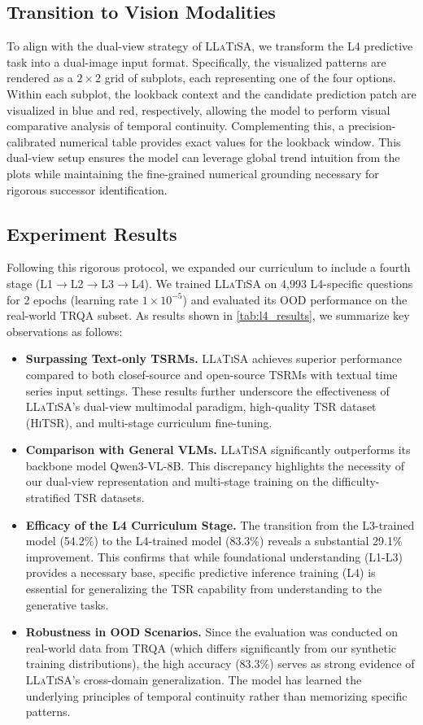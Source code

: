\documentclass[11pt]{article}
\begin{document}
\subsection{Transition to Vision Modalities}
To align with the dual-view strategy of \textsc{LLaTiSA}, we transform the L4 predictive task into a dual-image input format. Specifically, the visualized patterns are rendered as a $2\times2$ grid of subplots, each representing one of the four options. Within each subplot, the lookback context and the candidate prediction patch are visualized in blue and red, respectively, allowing the model to perform visual comparative analysis of temporal continuity. Complementing this, a precision-calibrated numerical table provides exact values for the lookback window. This dual-view setup ensures the model can leverage global trend intuition from the plots while maintaining the fine-grained numerical grounding necessary for rigorous successor identification.

\subsection{Experiment Results}
Following this rigorous protocol, we expanded our curriculum to include a fourth stage (L1$\rightarrow$L2$\rightarrow$L3$\rightarrow$L4). We trained \textsc{LLaTiSA} on 4,993 L4-specific questions for 2 epochs (learning rate $1 \times 10^{-5}$) and evaluated its OOD performance on the real-world TRQA \cite{trqa} subset. As results shown in \cref{tab:l4_results}, we summarize key observations as follows:
\begin{itemize}[left=0pt]
    \item \textbf{Surpassing Text-only TSRMs.} \textsc{LLaTiSA} achieves superior performance compared to both closef-source and open-source TSRMs with textual time series input settings. These results further underscore the effectiveness of \textsc{LLaTiSA}'s dual-view multimodal paradigm, high-quality TSR dataset (\textsc{HiTSR}), and multi-stage curriculum fine-tuning.
    \item \textbf{Comparison with General VLMs.} \textsc{LLaTiSA} significantly outperforms its backbone model Qwen3-VL-8B. This discrepancy highlights the necessity of our dual-view representation and multi-stage training on the difficulty-stratified TSR datasets.
    \item \textbf{Efficacy of the L4 Curriculum Stage.} The transition from the L3-trained model (54.2\%) to the L4-trained model (83.3\%) reveals a substantial 29.1\% improvement. This confirms that while foundational understanding (L1-L3) provides a necessary base, specific predictive inference training (L4) is essential for generalizing the TSR capability from understanding to the generative tasks.
    \item \textbf{Robustness in OOD Scenarios.} Since the evaluation was conducted on real-world data from TRQA (which differs significantly from our synthetic training distributions), the high accuracy (83.3\%) serves as strong evidence of \textsc{LLaTiSA}'s cross-domain generalization. The model has learned the underlying principles of temporal continuity rather than memorizing specific patterns.
\end{itemize}
\end{document}
